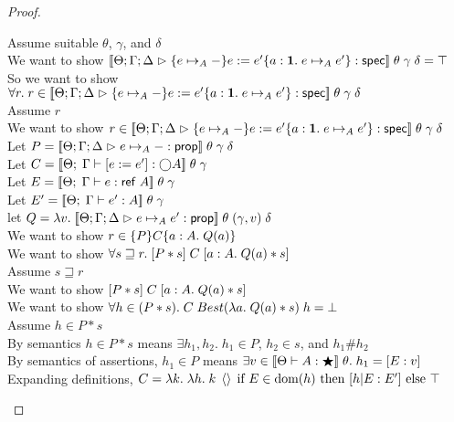 \begin{proof}
  \begin{tabbedproof}
    \oo Assume suitable $\theta$, $\gamma$, and $\delta$ \\
    \ooo We want to show $\interp{\judgeS{\spec{e \pointsto_A -}{e := e'}{a:\unittype}{e \pointsto_A e'}}}\;\theta\;\gamma\;\delta = \top$ \\
    \ooo So we want to show $\forall r.\; r \in \interp{\judgeS{\spec{e \pointsto_A -}{e := e'}{a:\unittype}{e \pointsto_A e'}}}\;\theta\;\gamma\;\delta$ \\
    \ooo Assume $r$ \\
    \oooo We want to show $r \in \interp{\judgeS{\spec{e \pointsto_A -}{e := e'}{a:\unittype}{e \pointsto_A e'}}}\;\theta\;\gamma\;\delta$ \\
    \oooo Let $P = \interp{\judgeA{e \pointsto_A -}{\assert}}\;\theta\;\gamma\;\delta$ \\
    \oooo Let $C = \interp{\judgeE[\Theta]{\Gamma}{\comp{e := e'}}{\monad{A}}}\;\theta\;\gamma$ \\
    \oooo Let $E = \interp{\judgeE[\Theta]{\Gamma}{e}{\reftype{A}}}\;\theta\;\gamma$ \\
    \oooo Let $E' = \interp{\judgeE[\Theta]{\Gamma}{e'}{A}}\;\theta\;\gamma$ \\
    \oooo let $Q = \semfun{v}{\interp{\judgeA{e \pointsto_A e'}{\assert}}\;\theta\;(\gamma, v)\;\delta}$ \\
    \oooo We want to show $r \in \spec{P}{C}{a:A}{Q(a)}$ \\
    \oooo We want to show $\forall s \sqsupseteq r.\; \basicspec{P * s}{C}{a:A}{Q(a) * s}$ \\
    \oooo Assume $s \sqsupseteq r$ \\
    \ooooo We want to show $\basicspec{P * s}{C}{a:A}{Q(a) * s}$ \\
    \ooooo We want to show $\forall h \in (P * s).\; C\;Best(\semfun{a}{Q(a) * s})\;h = \bot$ \\
    \ooooo Assume $h \in P * s$ \\
    \oooooo By semantics $h \in P * s$ means $\exists h_1, h_2.\; h_1 \in P$, $h_2 \in s$, and
            $h_1 \# h_2$ \\
    \oooooo By semantics of assertions, $h_1 \in P$ means 
            $\exists v \in \interp{\judgeWK[\Theta]{A}{\bigstar}}\;\theta.\;
               h_1 = [E:v]$ \\
    \oooooo Expanding definitions, 
             $C = \semfun{k}{\semfun{h}{k\;\unit\;\mbox{if } E\in\domain{h} \mbox{ then } [h|E:E'] \mbox{ else }\top}}$ \\

\end{tabbedproof}
\end{proof}
